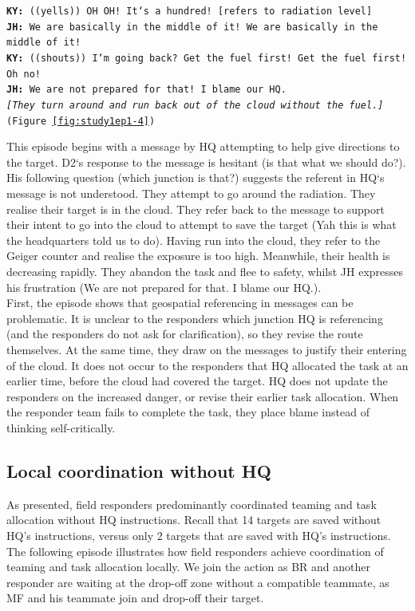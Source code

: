 \noindent\texttt{\textbf{KY:} ((yells)) OH OH! It`s a hundred! [refers to radiation level]\\
\textbf{JH:} We are basically in the middle of it! We are basically in the middle of it!\\
\textbf{KY:} ((shouts)) I`m going back? Get the fuel first! Get the fuel first! Oh no! \\
\textbf{JH:} We are not prepared for that! I blame our HQ.\\
\emph{ [They turn around and run back out of the cloud without the fuel.] }(Figure \ref{fig:study1ep1-4})\\
}

This episode begins with a message by HQ attempting to help give directions to the target. D2`s response to the message is hesitant (is that what we should do?). His following question (which junction is that?) suggests the referent in HQ`s message is not understood. They attempt to go around the radiation. They realise their target is in the cloud. They refer back to the message to support their intent to go into the cloud to attempt to save the target (Yah this is what the headquarters told us to do). Having run into the cloud, they refer to the Geiger counter and realise the exposure is too high. Meanwhile, their health is decreasing rapidly. They abandon the task and flee to safety, whilst JH expresses his frustration (We are not prepared for that. I blame our HQ.).\\

First, the episode shows that geospatial referencing in messages can be problematic. It is unclear to the responders which junction HQ is referencing (and the responders do not ask for clarification), so they revise the route themselves. At the same time, they draw on the messages to justify their entering of the cloud. It does not occur to the responders that HQ allocated the task at an earlier time, before the cloud had covered the target. HQ does not update the responders on the increased danger, or revise their earlier task allocation. When the responder team fails to complete the task, they place blame instead of thinking self-critically.\\

\subsection{Local coordination without HQ}\label{sec:s1localcoordination}
As presented, field responders predominantly coordinated teaming and task allocation without HQ instructions. Recall that 14 targets are saved without HQ's instructions, versus only 2 targets that are saved with HQ's instructions. The following episode illustrates how field responders achieve coordination of teaming and task allocation locally. We join the action as BR and another responder are waiting at the drop-off zone without a compatible teammate, as MF and his teammate join and drop-off their target.\\

